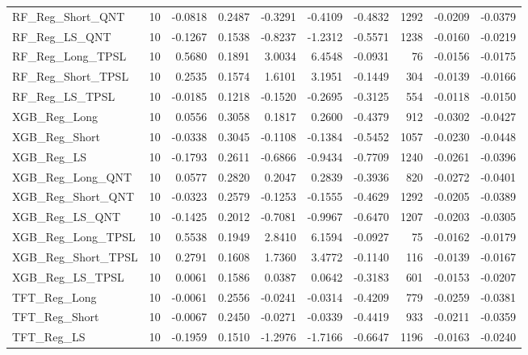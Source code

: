 \begin{tabular}{llrrrrrrrr}
\cline{1-10}
RF\_Reg\_Short\_QNT & 10 & -0.0818 & 0.2487 & -0.3291 & -0.4109 & -0.4832 & 1292 & -0.0209 & -0.0379 \\
\cline{1-10}
RF\_Reg\_LS\_QNT & 10 & -0.1267 & 0.1538 & -0.8237 & -1.2312 & -0.5571 & 1238 & -0.0160 & -0.0219 \\
\cline{1-10}
RF\_Reg\_Long\_TPSL & 10 & 0.5680 & 0.1891 & 3.0034 & 6.4548 & -0.0931 & 76 & -0.0156 & -0.0175 \\
\cline{1-10}
RF\_Reg\_Short\_TPSL & 10 & 0.2535 & 0.1574 & 1.6101 & 3.1951 & -0.1449 & 304 & -0.0139 & -0.0166 \\
\cline{1-10}
RF\_Reg\_LS\_TPSL & 10 & -0.0185 & 0.1218 & -0.1520 & -0.2695 & -0.3125 & 554 & -0.0118 & -0.0150 \\
\cline{1-10}
XGB\_Reg\_Long & 10 & 0.0556 & 0.3058 & 0.1817 & 0.2600 & -0.4379 & 912 & -0.0302 & -0.0427 \\
\cline{1-10}
XGB\_Reg\_Short & 10 & -0.0338 & 0.3045 & -0.1108 & -0.1384 & -0.5452 & 1057 & -0.0230 & -0.0448 \\
\cline{1-10}
XGB\_Reg\_LS & 10 & -0.1793 & 0.2611 & -0.6866 & -0.9434 & -0.7709 & 1240 & -0.0261 & -0.0396 \\
\cline{1-10}
XGB\_Reg\_Long\_QNT & 10 & 0.0577 & 0.2820 & 0.2047 & 0.2839 & -0.3936 & 820 & -0.0272 & -0.0401 \\
\cline{1-10}
XGB\_Reg\_Short\_QNT & 10 & -0.0323 & 0.2579 & -0.1253 & -0.1555 & -0.4629 & 1292 & -0.0205 & -0.0389 \\
\cline{1-10}
XGB\_Reg\_LS\_QNT & 10 & -0.1425 & 0.2012 & -0.7081 & -0.9967 & -0.6470 & 1207 & -0.0203 & -0.0305 \\
\cline{1-10}
XGB\_Reg\_Long\_TPSL & 10 & 0.5538 & 0.1949 & 2.8410 & 6.1594 & -0.0927 & 75 & -0.0162 & -0.0179 \\
\cline{1-10}
XGB\_Reg\_Short\_TPSL & 10 & 0.2791 & 0.1608 & 1.7360 & 3.4772 & -0.1140 & 116 & -0.0139 & -0.0167 \\
\cline{1-10}
XGB\_Reg\_LS\_TPSL & 10 & 0.0061 & 0.1586 & 0.0387 & 0.0642 & -0.3183 & 601 & -0.0153 & -0.0207 \\
\cline{1-10}
TFT\_Reg\_Long & 10 & -0.0061 & 0.2556 & -0.0241 & -0.0314 & -0.4209 & 779 & -0.0259 & -0.0381 \\
\cline{1-10}
TFT\_Reg\_Short & 10 & -0.0067 & 0.2450 & -0.0271 & -0.0339 & -0.4419 & 933 & -0.0211 & -0.0359 \\
\cline{1-10}
TFT\_Reg\_LS & 10 & -0.1959 & 0.1510 & -1.2976 & -1.7166 & -0.6647 & 1196 & -0.0163 & -0.0240 \\

\end{tabular}
